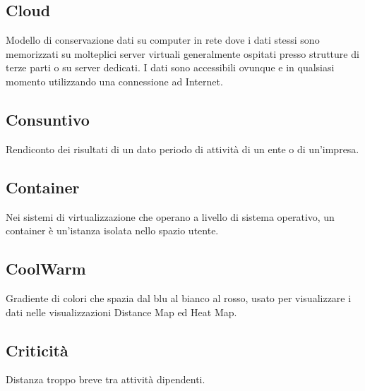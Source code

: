 \documentclass[../glossario.tex]{subfiles}
\begin{document}
\subsection*{Cloud}
Modello di conservazione dati su computer in rete dove i dati stessi sono memorizzati su molteplici server virtuali generalmente ospitati presso strutture di terze parti o su server dedicati. I dati sono accessibili ovunque e in qualsiasi momento utilizzando una connessione ad Internet.

\subsection*{Consuntivo}
Rendiconto dei risultati di un dato periodo di attività di un ente o di un'impresa.

\subsection*{Container}
Nei sistemi di virtualizzazione che operano a livello di sistema operativo, un container è un’istanza isolata nello spazio utente.

\subsection*{CoolWarm}
Gradiente di colori che spazia dal blu al bianco al rosso, usato per visualizzare i dati nelle visualizzazioni Distance Map ed Heat Map.

\subsection*{Criticità}
Distanza troppo breve tra attività dipendenti.
\end{document}
